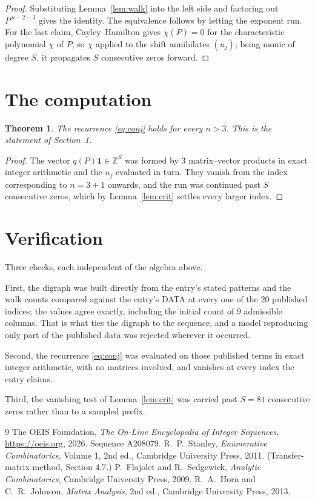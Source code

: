 \documentclass[11pt,a4paper]{article}
\theoremstyle{plain}
\newtheorem{theorem}{Theorem}
\theoremstyle{definition}
\begin{document}
\begin{proof}
Substituting Lemma~\ref{lem:walk} into the left side and factoring out
$P^{\,n-2-3}$ gives the identity. The equivalence follows by letting the exponent
run. For the last claim, Cayley--Hamilton gives $\chi(P)=0$ for the characteristic
polynomial $\chi$ of $P$, so $\chi$ applied to the shift annihilates $(u_j)$; being monic of
degree $S$, it propagates $S$ consecutive zeros forward.
\end{proof}

\section{The computation}

\begin{theorem}
The recurrence \eqref{eq:conj} holds for every $n>3$. This is the statement of
Section~1.
\end{theorem}

\begin{proof}
The vector $q(P)\mathbf{1}\in\mathbb{Z}^{S}$ was formed by $3$ matrix--vector
products in exact integer arithmetic and the $u_j$ evaluated in turn. They vanish from the
index corresponding to $n=3+1$ onwards, and the run was continued past $S$ consecutive
zeros, which by Lemma~\ref{lem:crit} settles every larger index.
\end{proof}

\section{Verification}

Three checks, each independent of the algebra above.

First, the digraph was built directly from the entry's stated patterns and the walk counts
compared against the entry's DATA at every one of the $20$ published indices; the
values agree exactly, including the initial count of $9$ admissible columns. That is
what ties the digraph to the sequence, and a model reproducing only part of the published
data was rejected wherever it occurred.

Second, the recurrence \eqref{eq:conj} was evaluated on those published terms in exact
integer arithmetic, with no matrices involved, and vanishes at every index the entry claims.

Third, the vanishing test of Lemma~\ref{lem:crit} was carried past $S=81$ consecutive
zeros rather than to a sampled prefix.

\begin{thebibliography}{9}
 The OEIS Foundation, \emph{The On-Line Encyclopedia of Integer
Sequences}, \url{https://oeis.org}, 2026. Sequence A208079.
 R.~P.~Stanley, \emph{Enumerative Combinatorics}, Volume 1, 2nd ed.,
Cambridge University Press, 2011. (Transfer-matrix method, Section 4.7.)
 P.~Flajolet and R.~Sedgewick, \emph{Analytic Combinatorics}, Cambridge
University Press, 2009.
 R.~A.~Horn and C.~R.~Johnson, \emph{Matrix Analysis}, 2nd ed., Cambridge
University Press, 2013.
\end{thebibliography}
\end{document}
